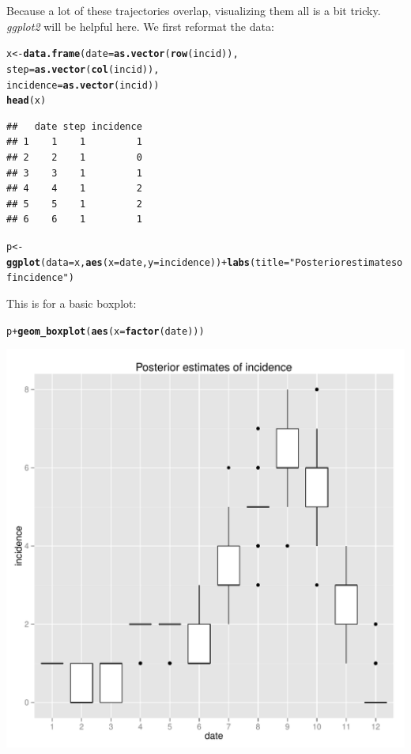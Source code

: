 \documentclass{article}\usepackage[]{graphicx}\usepackage[]{color}
\makeatletter
\newcommand{\hlstr}[1]{\textcolor[rgb]{0.192,0.494,0.8}{#1}}%
\newcommand{\hlopt}[1]{\textcolor[rgb]{0,0,0}{#1}}%
\newcommand{\hlstd}[1]{\textcolor[rgb]{0.345,0.345,0.345}{#1}}%
\newcommand{\hlkwb}[1]{\textcolor[rgb]{0.69,0.353,0.396}{#1}}%
\newcommand{\hlkwc}[1]{\textcolor[rgb]{0.333,0.667,0.333}{#1}}%
\newcommand{\hlkwd}[1]{\textcolor[rgb]{0.737,0.353,0.396}{\textbf{#1}}}%
\newenvironment{kframe}{%
 \def\at@end@of@kframe{}%
 \ifinner\ifhmode%
  \def\at@end@of@kframe{\end{minipage}}%
  \begin{minipage}{\columnwidth}%
 \fi\fi%
 \def\FrameCommand##1{\hskip\@totalleftmargin \hskip-\fboxsep
 \colorbox{shadecolor}{##1}\hskip-\fboxsep
     \hskip-\linewidth \hskip-\@totalleftmargin \hskip\columnwidth}%
 \MakeFramed {\advance\hsize-\width
   \@totalleftmargin\z@ \linewidth\hsize
   \@setminipage}}%
 {\par\unskip\endMakeFramed%
 \at@end@of@kframe}
\newenvironment{knitrout}{}{} %
\makeatother
\begin{document}
Because a lot of these trajectories overlap, visualizing them all is a bit tricky.
\textit{ggplot2} will be helpful here.
We first reformat the data:
\begin{knitrout}
\color{fgcolor}\begin{kframe}
\begin{alltt}
\hlstd{x} \hlkwb{<-} \hlkwd{data.frame}\hlstd{(}\hlkwc{date}\hlstd{=}\hlkwd{as.vector}\hlstd{(}\hlkwd{row}\hlstd{(incid)),}
                \hlkwc{step}\hlstd{=}\hlkwd{as.vector}\hlstd{(}\hlkwd{col}\hlstd{(incid)),}
                \hlkwc{incidence}\hlstd{=}\hlkwd{as.vector}\hlstd{(incid))}
\hlkwd{head}\hlstd{(x)}
\end{alltt}
\begin{verbatim}
##   date step incidence
## 1    1    1         1
## 2    2    1         0
## 3    3    1         1
## 4    4    1         2
## 5    5    1         2
## 6    6    1         1
\end{verbatim}
\begin{alltt}
\hlstd{p} \hlkwb{<-} \hlkwd{ggplot}\hlstd{(}\hlkwc{data}\hlstd{=x,} \hlkwd{aes}\hlstd{(}\hlkwc{x}\hlstd{=date,} \hlkwc{y}\hlstd{=incidence))} \hlopt{+} \hlkwd{labs}\hlstd{(}\hlkwc{title}\hlstd{=}\hlstr{"Posterior estimates of incidence"}\hlstd{)}
\end{alltt}
\end{kframe}
\end{knitrout}


This is for a basic boxplot:
\begin{knitrout}
\color{fgcolor}\begin{kframe}
\begin{alltt}
\hlstd{p} \hlopt{+} \hlkwd{geom_boxplot}\hlstd{(}\hlkwd{aes}\hlstd{(}\hlkwc{x}\hlstd{=}\hlkwd{factor}\hlstd{(date)))}
\end{alltt}
\end{kframe}

{\centering \includegraphics[width=.6\textwidth]{figs/unnamed-chunk-48} 

}



\end{knitrout}
\end{document}
